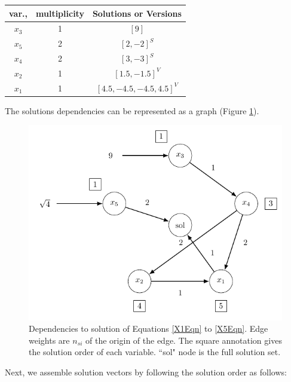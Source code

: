 \documentclass[letterpaper]{article}
\begin{document}
\vspace{0.25in}
\begin{center}
\begin{tabular}{c|c|c}
var.,    & multiplicity  &  Solutions or Versions\\\hline
$x_3$    &   1    & $[9]$\\
$x_5$    &   2    & $[2,-2]^S$\\
$x_4$    &   2    & $[3,-3]^S$\\
$x_2$    &   1    & $[1.5,-1.5]^V$\\
$x_1$    &   1    & $[4.5,-4.5,-4.5,4.5]^V$\\
\end{tabular}
\end{center}


The solutions dependencies can be represented as a graph (Figure \ref{graphFig}).

\begin{figure}\centering
\includegraphics[width=0.5\linewidth]{solutionGraph.png}
\caption{Dependencies to solution of Equations \ref{X1Eqn} to \ref{X5Eqn}.   Edge weights are
         $n_{si}$ of the origin of the edge.  The square annotation gives the solution order of each variable.
         ``sol" node is the full solution set. }\label{graphFig}
\end{figure}

\vspace{0.25in}
Next, we assemble solution vectors by following the solution order as follows:
\end{document}
